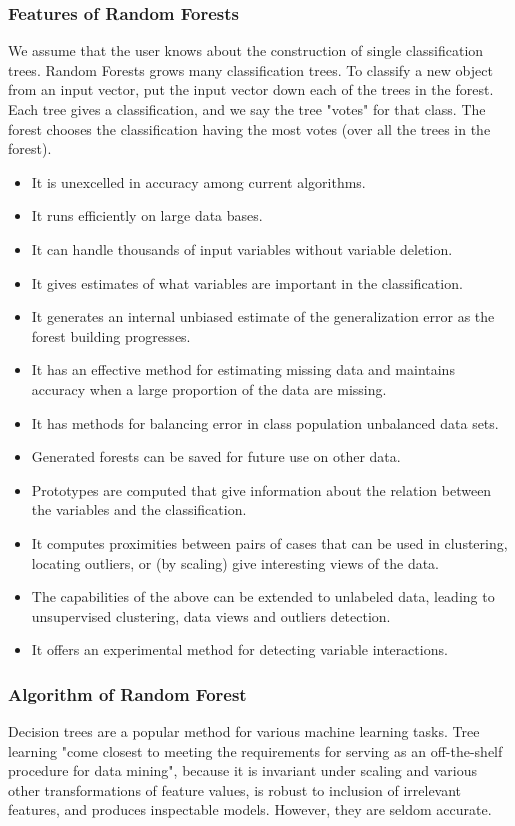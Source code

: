 \documentclass[document.tex]{subfiles}
\begin{document}
\subsubsection{Features of Random Forests}
We assume that the user knows about the construction of single classification trees. Random Forests grows many classification trees. To classify a new object from an input vector, put the input vector down each of the trees in the forest. Each tree gives a classification, and we say the tree "votes" for that class. The forest chooses the classification having the most votes (over all the trees in the forest).
\begin{itemize}
	\item It is unexcelled in accuracy among current algorithms.
	\item It runs efficiently on large data bases.
	\item It can handle thousands of input variables without variable deletion.
	\item It gives estimates of what variables are important in the classification.
	\item It generates an internal unbiased estimate of the generalization error as the forest building progresses.
	\item It has an effective method for estimating missing data and maintains accuracy when a large proportion of the data are missing.
	\item It has methods for balancing error in class population unbalanced data sets.
	\item Generated forests can be saved for future use on other data.
	\item Prototypes are computed that give information about the relation between the variables and the classification.
	\item It computes proximities between pairs of cases that can be used in clustering, locating outliers, or (by scaling) give interesting views of the data.
	\item The capabilities of the above can be extended to unlabeled data, leading to unsupervised clustering, data views and outliers detection.
	\item It offers an experimental method for detecting variable interactions.
\end{itemize}
\subsubsection{Algorithm of Random Forest}
Decision trees are a popular method for various machine learning tasks. Tree learning "come closest to meeting the requirements for serving as an off-the-shelf procedure for data mining", because it is invariant under scaling and various other transformations of feature values, is robust to inclusion of irrelevant features, and produces inspectable models. However, they are seldom accurate.
\end{document}
